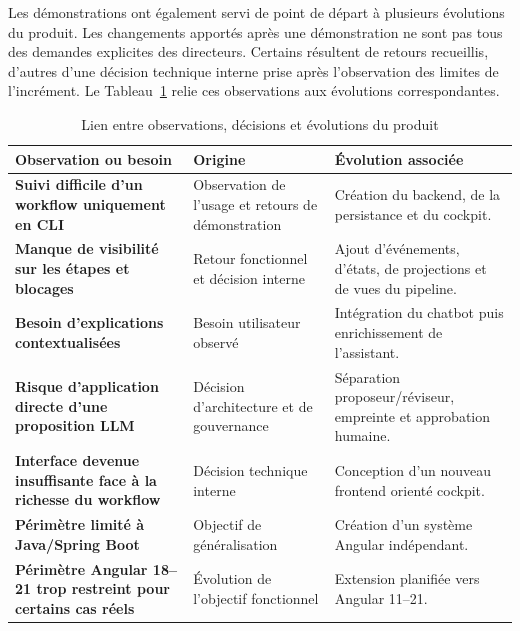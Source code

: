 Les démonstrations ont également servi de point de départ à plusieurs évolutions du produit. Les changements apportés après une démonstration ne sont pas tous des demandes explicites des directeurs. Certains résultent de retours recueillis, d'autres d'une décision technique interne prise après l'observation des limites de l'incrément. Le Tableau~\ref{tab:observations-evolutions-ch5} relie ces observations aux évolutions correspondantes.

\begin{table}[H]
    \centering
    \caption{Lien entre observations, décisions et évolutions du produit}
    \label{tab:observations-evolutions-ch5}
    \small
    \begin{tabularx}{\textwidth}{|>{\bfseries\RaggedRight\arraybackslash}p{4.2cm}|>{\RaggedRight\arraybackslash}p{4.1cm}|>{\RaggedRight\arraybackslash}X|}
        \hline
        \rowcolor{cgilight!95}
        \textbf{Observation ou besoin} & \textbf{Origine} & \textbf{Évolution associée} \\
        \hline
        Suivi difficile d'un workflow uniquement en CLI & Observation de l'usage et retours de démonstration & Création du backend, de la persistance et du cockpit. \\
        \hline
        Manque de visibilité sur les étapes et blocages & Retour fonctionnel et décision interne & Ajout d'événements, d'états, de projections et de vues du pipeline. \\
        \hline
        Besoin d'explications contextualisées & Besoin utilisateur observé & Intégration du chatbot puis enrichissement de l'assistant. \\
        \hline
        Risque d'application directe d'une proposition LLM & Décision d'architecture et de gouvernance & Séparation proposeur/réviseur, empreinte et approbation humaine. \\
        \hline
        Interface devenue insuffisante face à la richesse du workflow & Décision technique interne & Conception d'un nouveau frontend orienté cockpit. \\
        \hline
        Périmètre limité à Java/Spring Boot & Objectif de généralisation & Création d'un système Angular indépendant. \\
        \hline
        Périmètre Angular 18--21 trop restreint pour certains cas réels & Évolution de l'objectif fonctionnel & Extension planifiée vers Angular 11--21. \\
        \hline
    \end{tabularx}
\end{table}

